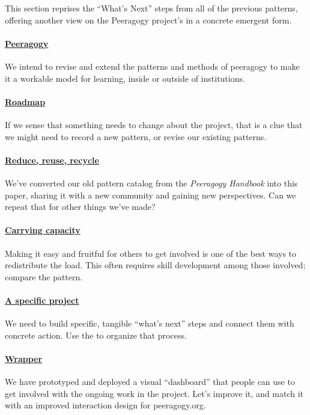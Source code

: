 \begin{refsection}

This section reprises the ``What's Next'' steps from all of the previous
patterns, offering another view on the Peeragogy project's
 in a concrete emergent form.

\paragraph{\hyperref[sec:Peeragogy]{Peeragogy}} 
 We intend to revise and extend the patterns and methods of peeragogy to make it a workable model for learning, inside or outside of institutions.

\paragraph{\hyperref[sec:Roadmap]{Roadmap}} 
If we sense that something needs to change about the project, that is a clue that we might need to record a new pattern, or revise our existing patterns.

\paragraph{\hyperref[sec:Reduce, reuse, recycle]{Reduce, reuse, recycle}}
We've converted our old pattern catalog from the \emph{Peeragogy Handbook} into this paper, sharing it with a new community and gaining new perspectives.  Can we repeat that for other things we've made?

\paragraph{\hyperref[sec:Carrying capacity]{Carrying capacity}} 
Making it easy and fruitful for others to get involved is one of the best ways to redistribute the load.  This often requires skill development among those involved; compare the  pattern.

\paragraph{\hyperref[sec:A specific project]{A specific project}}
We need to build specific, tangible ``what's next'' steps and connect them with concrete action. Use the  to organize that process. 

\paragraph{\hyperref[sec:Wrapper]{Wrapper}}
We have prototyped and deployed a visual ``dashboard'' that people can use to get involved with the ongoing work in the project.  Let's improve it, and match it with an improved interaction design for peeragogy.org.


\end{refsection}
